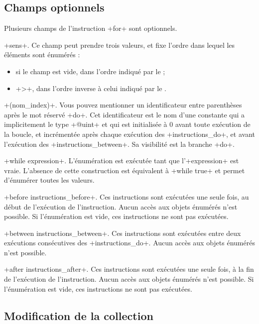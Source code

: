 \subsection{Champs optionnels}

Plusieurs champs de l'instruction \ggs+for+ sont optionnels.


\ggs+sens+. Ce champ peut prendre trois valeurs, et fixe l'ordre dans lequel les éléments sont énumérés :
\begin{itemize}
  \item si le champ est vide, dans l'ordre indiqué par le  ;
  \item \ggs+>+, dans l'ordre inverse à celui indiqué par le .
\end{itemize}


\ggs+(nom_index)+. Vous pouvez mentionner un identificateur entre parenthèses après le mot réservé \ggs+do+. Cet identificateur est le nom d'une constante qui a implicitement le type \ggs+@uint+ et qui est initialisée à 0 avant toute exécution de la boucle, et incrémentée après chaque exécution des \ggs+instructions_do+, et avant l'exécution des \ggs+instructions_between+. Sa visibilité est la branche \ggs+do+.

\ggs+while expression+. L'énumération est exécutée tant que l'\ggs+expression+ est vraie. L'absence de cette construction est équivalent à \ggs+while true+ et permet d'énumérer toutes les valeurs.


\ggs+before instructions_before+. Ces instructions sont exécutées une seule fois, au début de l'exécution de l'instruction. Aucun accès aux objets énumérés n'est possible. Si l'énumération est vide, ces instructions ne sont pas exécutées.

\ggs+between instructions_between+. Ces instructions sont exécutées entre deux exécutions consécutives des \ggs+instructions_do+. Aucun accès aux objets énumérés n'est possible.

\ggs+after instructions_after+. Ces instructions sont exécutées une seule fois, à la fin de l'exécution de l'instruction. Aucun accès aux objets énumérés n'est possible. Si l'énumération est vide, ces instructions ne sont pas exécutées.


\subsection{Modification de la collection}

